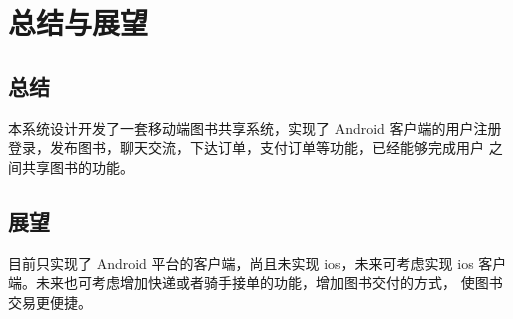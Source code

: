 
\chapter{总结与展望}

\section{总结}

本系统设计开发了一套移动端图书共享系统，实现了 Android 客户端的用户注册登录，发布图书，聊天交流，下达订单，支付订单等功能，已经能够完成用户
之间共享图书的功能。

\section{展望}
目前只实现了 Android 平台的客户端，尚且未实现 ios，未来可考虑实现 ios 客户端。未来也可考虑增加快递或者骑手接单的功能，增加图书交付的方式，
使图书交易更便捷。
